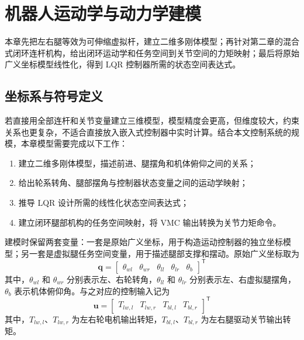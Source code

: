 \chapter{机器人运动学与动力学建模}\label{chap:model}

本章先把左右腿等效为可伸缩虚拟杆，建立二维多刚体模型；再针对第二章的混合式闭环连杆机构，给出闭环运动学和任务空间到关节空间的力矩映射；最后将原始广义坐标模型线性化，得到 LQR 控制器所需的状态空间表达式。

\section{坐标系与符号定义}

若直接用全部连杆和关节变量建立三维模型，模型精度会更高，但维度较大，约束关系也更复杂，不适合直接放入嵌入式控制器中实时计算。结合本文控制系统的规模，本章模型需要完成以下工作：

\begin{enumerate}
  \item 建立二维多刚体模型，描述前进、腿摆角和机体俯仰之间的关系；
  \item 给出轮系转角、腿部摆角与控制器状态变量之间的运动学映射；
  \item 推导 LQR 设计所需的线性化状态空间表达式；
  \item 建立闭环腿部机构的任务空间映射，将 VMC 输出转换为关节力矩命令。
\end{enumerate}

建模时保留两套变量：一套是原始广义坐标，用于构造运动控制器的独立坐标模型；另一套是虚拟腿任务空间变量，用于描述腿部支撑和摆动。原始广义坐标取为
\begin{equation}
  \boldsymbol{q} =
  \begin{bmatrix}
    \theta_{wl} & \theta_{wr} & \theta_{ll} & \theta_{lr} & \theta_b
  \end{bmatrix}^{\mathsf{T}}
  \label{eq:generalized-coordinate-origin}
\end{equation}
其中，$\theta_{wl}$ 和 $\theta_{wr}$ 分别表示左、右轮转角，$\theta_{ll}$ 和 $\theta_{lr}$ 分别表示左、右虚拟腿摆角，$\theta_b$ 表示机体俯仰角。与之对应的控制输入记为
\begin{equation}
  \boldsymbol{u} =
  \begin{bmatrix}
    T_{lw,l} & T_{lw,r} & T_{bl,l} & T_{bl,r}
  \end{bmatrix}^{\mathsf{T}}
  \label{eq:input-origin}
\end{equation}
其中，$T_{lw,l}$、$T_{lw,r}$ 为左右轮电机输出转矩，$T_{bl,l}$、$T_{bl,r}$ 为左右腿驱动关节输出转矩。

